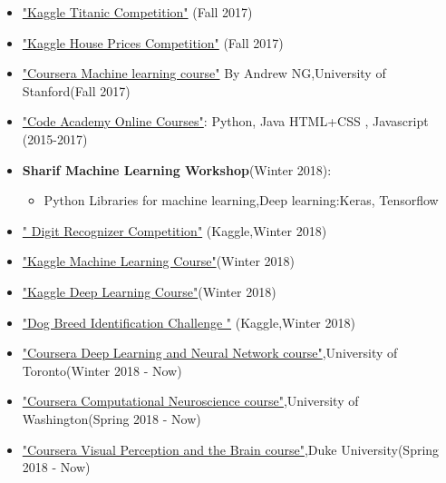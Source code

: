 \documentclass[letterpaper,MMMyyyy,nonstopmode]{simpleresumecv}
\begin{document}
\begin{Body}
\begin{itemize}
	  \item  \href {https://www.kaggle.com/c/titanic}{"Kaggle Titanic Competition"} (Fall 2017)
	  \item  \href {https://www.kaggle.com/c/house-prices-advanced-regression-techniques}{"Kaggle House Prices Competition"} (Fall 2017)
	 

	 
	  \item  \href {https://www.coursera.org/learn/machine-learning/home/welcome}{"Coursera Machine learning course"}  By Andrew NG,University of Stanford(Fall 2017)
	   \item  \href {https://www.codecademy.com/learn} {"Code Academy Online Courses"}: Python, Java HTML+CSS , Javascript  (2015-2017)
             \item
	     \textbf{ Sharif Machine Learning Workshop}(Winter 2018):
	      \begin{itemize}
	          \item Python Libraries for machine learning,Deep learning:Keras, Tensorflow
	      
	      \end{itemize}
	      	    \item  \href {https://www.kaggle.com/c/digit-recognizer}{" Digit Recognizer Competition"} (Kaggle,Winter 2018)
        \item
        \href {https://www.kaggle.com/learn/machine-learning}{"Kaggle Machine Learning Course"}(Winter 2018)
        
         \item
        \href {https://www.kaggle.com/learn/deep-learning}{"Kaggle Deep Learning Course"}(Winter 2018)
        
         	\item 
      \href{ https://www.kaggle.com/c/dog-breed-identification}{"Dog Breed Identification Challenge "} (Kaggle,Winter 2018)
       
        \item \href {https://www.coursera.org/learn/neural-networks/home/welcome}{"Coursera Deep Learning and Neural Network course"},University of Toronto(Winter 2018 - Now)
        
           \item \href {https://www.coursera.org/learn/computational-neuroscience/home/welcome}{"Coursera Computational Neuroscience course"},University of Washington(Spring 2018 - Now)
           
                 \item \href {https://www.coursera.org/learn/computational-neuroscience/home/welcome}{"Coursera Visual Perception and the Brain course"},Duke University(Spring 2018 - Now)
           

\end{itemize}
\end{Body}
\end{document}
